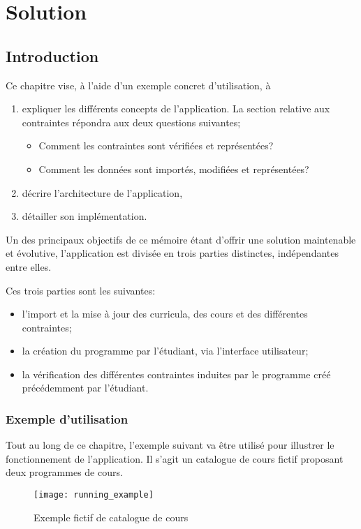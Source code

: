 \chapter{Solution}
\label{solution}
\section{Introduction}
Ce chapitre vise, à l'aide d'un exemple concret d'utilisation,  à 
\begin{enumerate}
\item expliquer les différents concepts de l'application. La section relative aux contraintes répondra aux deux questions suivantes;
	\begin{itemize}
		\item Comment les contraintes sont vérifiées et représentées?
		\item Comment les données sont importés, modifiées et représentées?
	\end{itemize}
\item décrire l'architecture de l'application,
\item détailler son implémentation.
\end{enumerate}

Un des principaux objectifs de ce mémoire étant d'offrir une solution maintenable et évolutive, l'application est divisée en trois parties distinctes, indépendantes entre elles. 

Ces trois parties sont les suivantes:
\begin{itemize}
\item l'import et la mise à jour des curricula, des cours et des différentes contraintes; 
\item la création du programme par l'étudiant, via l'interface utilisateur;
\item la vérification des différentes contraintes induites par le programme créé précédemment par l'étudiant.
\end{itemize}

\subsection{Exemple d'utilisation}

Tout au long de ce chapitre, l'exemple suivant va être utilisé pour illustrer le fonctionnement de l'application. Il s'agit un catalogue de cours fictif proposant deux programmes de cours.

\begin{figure}[H]
\centering
\caption{Exemple fictif de catalogue de cours}
\texttt{[image: running\_example]}
\end{figure}

